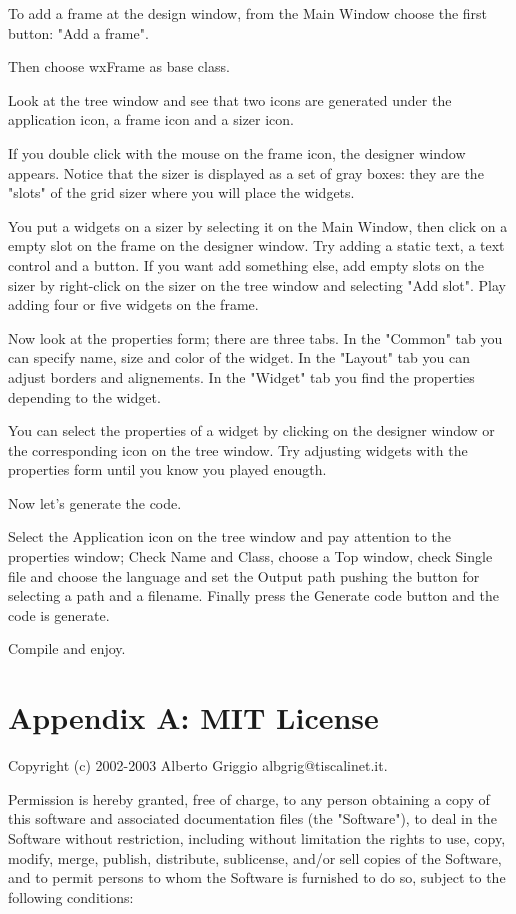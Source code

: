 \documentclass[a4paper,10pt]{report}
\begin{document}
To add a frame at the design window, from the Main Window choose
the first button: "Add a frame".

Then choose wxFrame as base class.

Look at the tree window and see that two icons are generated
under the application icon, a frame icon and a sizer icon.

If you double click with the mouse on the frame icon, the designer
window appears.
Notice that the sizer is displayed as a set of gray boxes: they are
the "slots" of the grid sizer where you will place the widgets.

You put a widgets on a sizer by selecting it on the Main Window,
then click on a empty slot on the frame on the designer window.
Try adding a static text, a text control and a button.
If you want add something else, add empty slots on the sizer by
right-click on the sizer on the tree window and selecting "Add slot".
Play adding four or five widgets on the frame.

Now look at the properties form; there are three tabs. In the "Common"
tab you can specify name, size and color of the widget.
In the "Layout" tab you can adjust borders and alignements.
In the "Widget" tab you find the properties depending to the
widget.

You can select the properties of a widget by clicking on the designer window
or the corresponding icon on the tree window.
Try adjusting widgets with the properties form until you know you
played enougth.

Now let's generate the code.

Select the Application icon on the tree window and
pay attention to the properties window;
Check Name and Class, choose a Top window, check Single file and
choose the language
and set the Output path pushing the button for selecting a path and a filename.
Finally press the Generate code button and the code is generate.

Compile and enjoy.



\appendix

\chapter{Appendix A: MIT License}
Copyright (c) 2002-2003 Alberto Griggio  albgrig@tiscalinet.it.

Permission is hereby granted, free of charge, to any person obtaining
a copy of
this software and associated documentation files (the "Software"),
to deal in
the Software without restriction, including without limitation
the rights to
use, copy, modify, merge, publish, distribute, sublicense, and/or
sell copies
of the Software, and to permit persons to whom the Software is
furnished to do
so, subject to the following conditions:
\end{document}
